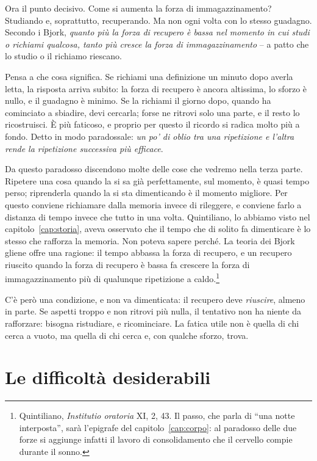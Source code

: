 Ora il punto decisivo. Come si aumenta la forza di immagazzinamento?
Studiando e, soprattutto, recuperando. Ma non ogni volta con lo stesso
guadagno. Secondo i Bjork, \emph{quanto più la forza di recupero è bassa
nel momento in cui studi o richiami qualcosa, tanto più cresce la forza
di immagazzinamento} -- a patto che lo studio o il richiamo riescano.

Pensa a che cosa significa. Se richiami una definizione un minuto dopo
averla letta, la risposta arriva subito: la forza di recupero è ancora
altissima, lo sforzo è nullo, e il guadagno è minimo. Se la richiami il
giorno dopo, quando ha cominciato a sbiadire, devi cercarla; forse ne
ritrovi solo una parte, e il resto lo ricostruisci. È più faticoso, e
proprio per questo il ricordo si radica molto più a fondo. Detto in
modo paradossale: \emph{un po' di oblio tra una ripetizione e l'altra
rende la ripetizione successiva più efficace}.

Da questo paradosso discendono molte delle cose che vedremo nella terza
parte. Ripetere una cosa quando la si sa già perfettamente, sul momento,
è quasi tempo perso; riprenderla quando la si sta dimenticando è il
momento migliore. Per questo conviene richiamare dalla memoria invece
di rileggere, e conviene farlo a distanza di tempo invece che tutto in
una volta. Quintiliano, lo abbiamo visto nel
capitolo~\ref{cap:storia}, aveva osservato che il tempo che di solito
fa dimenticare è lo stesso che rafforza la memoria. Non poteva sapere
perché. La teoria dei Bjork gliene offre una ragione: il tempo abbassa
la forza di recupero, e un recupero riuscito quando la forza di recupero
è bassa fa crescere la forza di immagazzinamento più di qualunque
ripetizione a caldo.\footnote{Quintiliano, \emph{Institutio oratoria}
XI, 2, 43. Il passo, che parla di \enquote{una notte interposta}, sarà
l'epigrafe del capitolo~\ref{cap:corpo}: al paradosso delle due forze
si aggiunge infatti il lavoro di consolidamento che il cervello compie
durante il sonno.}

C'è però una condizione, e non va dimenticata: il recupero deve
\emph{riuscire}, almeno in parte. Se aspetti troppo e non ritrovi più
nulla, il tentativo non ha niente da rafforzare: bisogna ristudiare, e
ricominciare. La fatica utile non è quella di chi cerca a vuoto, ma
quella di chi cerca e, con qualche sforzo, trova.

\section{Le difficoltà desiderabili}

